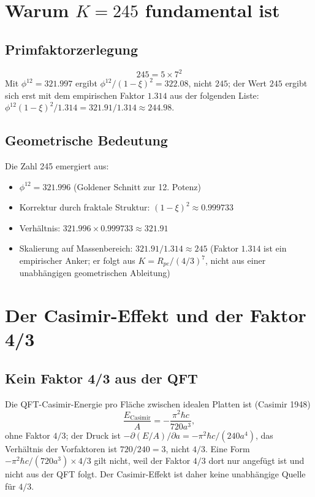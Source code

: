 	\section{Warum $K = 245$ fundamental ist}
	
	\subsection{Primfaktorzerlegung}
	\begin{equation}
		245 = 5 \times 7^2
	\end{equation}
	Mit $\phi^{12} = 321.997$ ergibt $\phi^{12}/(1-\xi)^2 = 322.08$, nicht $245$; der Wert $245$ ergibt sich erst mit dem empirischen Faktor $1.314$ aus der folgenden Liste: $\phi^{12}(1-\xi)^2/1.314 = 321.91/1.314 \approx 244.98$.
	
	\subsection{Geometrische Bedeutung}
	
	Die Zahl 245 emergiert aus:
	\begin{itemize}
		\item $\phi^{12} = 321.996$ (Goldener Schnitt zur 12. Potenz)
		\item Korrektur durch fraktale Struktur: $(1 - \xi)^2 \approx 0.999733$
		\item Verhältnis: $321.996 \times 0.999733 \approx 321.91$
		\item Skalierung auf Massenbereich: $321.91/1.314 \approx 245$ (Faktor $1.314$ ist ein empirischer Anker; er folgt aus $K = R_{pe}/(4/3)^7$, nicht aus einer unabhängigen geometrischen Ableitung)
	\end{itemize}
	
		\section{Der Casimir-Effekt und der Faktor 4/3}

	\subsection{Kein Faktor 4/3 aus der QFT}

	Die QFT-Casimir-Energie pro Fläche zwischen idealen Platten ist (Casimir 1948)
	\begin{equation}
		\frac{E_{\text{Casimir}}}{A} = -\frac{\pi^2 \hbar c}{720 a^3},
	\end{equation}
	ohne Faktor $4/3$; der Druck ist $-\partial(E/A)/\partial a = -\pi^2\hbar c/(240 a^4)$, das Verhältnis der Vorfaktoren ist $720/240 = 3$, nicht $4/3$. Eine Form $-\pi^2\hbar c/(720 a^3) \times 4/3$ gilt nicht, weil der Faktor $4/3$ dort nur angefügt ist und nicht aus der QFT folgt. Der Casimir-Effekt ist daher keine unabhängige Quelle für $4/3$.
	
